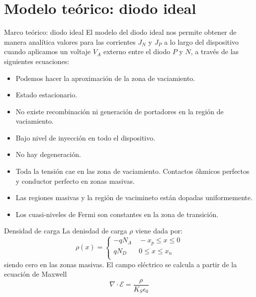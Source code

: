 \documentclass[aspectratio=169,xcolor=dvipsnames]{beamer}
\newcommand{\Ecal}{\mathcal{E}}
\begin{document}
\section{Modelo teórico: diodo ideal}

\begin{frame}{Marco teórico: diodo ideal}
    El modelo del diodo ideal nos permite obtener de manera analítica valores para las corrientes $J_N$ y $J_P$ a lo largo del dispositivo cuando aplicamos un voltaje $V_A$ externo entre el diodo $P$ y $N$, a través de las siguientes ecuaciones: 
    \begin{itemize}
        \item Podemos hacer la aproximación de la zona de vaciamiento.
        \item Estado estacionario. 
        \item No existe recombinación ni generación de portadores en la región de vaciamiento. 
        \item Bajo nivel de inyección en todo el dispositivo. 
        \item No hay degeneración. 
        \item Toda la tensión cae en las zona de vaciamiento. Contactos óhmicos perfectos y conductor perfecto en zonas masivas. 
        \item Las regiones masivas y la región de vacimineto están dopadas uniformemente.
        \item Los cuasi-niveles de Fermi son constantes en la zona de transición. 
    \end{itemize}
\end{frame}

\begin{frame}{Densidad de carga}
    La denisdad de carga $\rho$ viene dada por:
    \begin{equation*}
        \rho (x) = \left\lbrace \begin{array}{ll}
            - q N_A   & \ - x_p \leq x \leq 0 \\
            q N_D  & \ 0 \leq x \leq x_n \\
        \end{array} \right.
    \end{equation*}
    siendo cero en las zonas masivas. El campo eléctrico se calcula a partir de la ecuación de Maxwell
    \begin{equation*}
        \nabla \cdot \Ecal = \frac{\rho}{K_S \epsilon_0}
    \end{equation*}
\end{frame}
\end{document}
